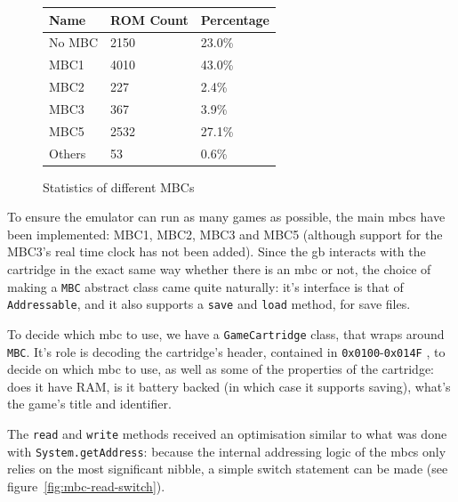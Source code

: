 \documentclass[11pt]{informatics-report}
\begin{document}
\begin{figure}[h]
    \centering
    \begin{tabular}{|l|l|l|}
    \hline
    \textbf{Name} & \textbf{ROM Count} & \textbf{Percentage} \\ \hline
    No MBC & 2150 & 23.0\% \\ \hline
    MBC1   & 4010 & 43.0\% \\ \hline
    MBC2   &  227 &  2.4\% \\ \hline
    MBC3   &  367 &  3.9\% \\ \hline
    MBC5   & 2532 & 27.1\% \\ \hline
    Others &   53 &  0.6\% \\ \hline
    \end{tabular}
       \caption{Statistics of different MBCs \cite{gb_rom_db}}
    \label{fig:stats-mbc}
\end{figure}

To ensure the emulator can run as many games as possible, the main \glspl{mbc} have been implemented: MBC1, MBC2, MBC3 and MBC5 (although support for the MBC3's real time clock has not been added). Since the \gls{gb} interacts with the cartridge in the exact same way whether there is an \gls{mbc} or not, the choice of making a \texttt{MBC} abstract class came quite naturally: it's interface is that of \texttt{Addressable}, and it also supports a \texttt{save} and \texttt{load} method, for save files.

To decide which \gls{mbc} to use, we have a \texttt{GameCartridge} class, that wraps around \texttt{MBC}. It's role is decoding the cartridge's header, contained in \texttt{0x0100}-\texttt{0x014F} \cite[The Cartridge Header]{pandoc}, to decide on which \gls{mbc} to use, as well as some of the properties of the cartridge: does it have RAM, is it battery backed (in which case it supports saving), what's the game's title and identifier.

The \texttt{read} and \texttt{write} methods received an optimisation similar to what was done with \texttt{System.getAddress}: because the internal addressing logic of the \glspl{mbc} only relies on the most significant nibble, a simple switch statement can be made (see figure~\ref{fig:mbc-read-switch}).
\end{document}

